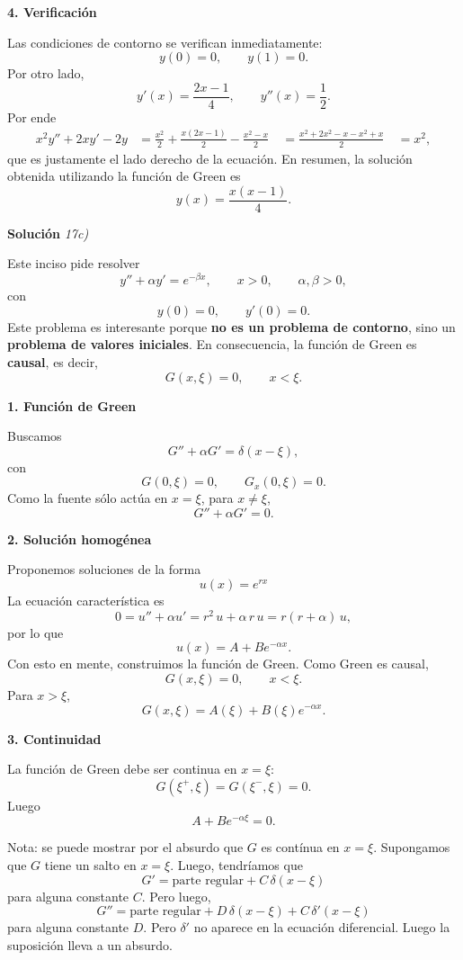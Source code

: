 \documentclass[11pt,spanish]{article}
\newcounter{problema}
\begin{document}
{\bf 4. Verificaci\'on}

Las condiciones de contorno se verifican inmediatamente:
$$
y(0)=0,
\qquad
y(1)=0.
$$
Por otro lado,
$$
y'(x)=\frac{2x-1}{4},
\qquad
y''(x)=\frac12.
$$
Por ende
$$
\begin{aligned}
x^2y''+2xy'-2y
&=
\frac{x^2}{2}
+\frac{x(2x-1)}{2}
-\frac{x^2-x}{2} \
&=
\frac{x^2+2x^2-x-x^2+x}{2} \
&=
x^2,
\end{aligned}
$$
que es justamente el lado derecho de la ecuaci\'on.
En resumen, la soluci\'on obtenida utilizando la funci\'on de Green es
$$
\boxed{y(x)=\frac{x(x-1)}{4}.}
$$

\vspace{0.5cm}
{\bf Soluci\'on }{\em 17c)}
\vspace{0.5cm}

Este inciso pide resolver 
$$
y''+\alpha y'=e^{-\beta x},
\qquad x>0,
\qquad
\alpha,\beta>0,
$$
con
$$
y(0)=0,
\qquad
y'(0)=0.
$$
Este problema es interesante porque {\bf no es un problema de contorno}, sino un {\bf problema de valores iniciales}. 
En consecuencia, la función de Green es {\bf causal}, es decir,
$$
G(x,\xi)=0,
\qquad x<\xi.
$$

{\bf 1. Función de Green}

Buscamos
$$
G''+\alpha G'
=
\delta(x-\xi),
$$
con
$$
G(0,\xi)=0,
\qquad
G_x(0,\xi)=0.
$$
Como la fuente sólo actúa en $x=\xi$, para $x\neq\xi$,
$$
G''+\alpha G'=0.
$$

{\bf 2. Solución homogénea}

Proponemos soluciones de la forma
$$
u(x) = e^{rx}
$$
La ecuación característica es
$$
0
=
u''+\alpha u'
=
r^2\, u + \alpha \,r\, u
=
r(r+\alpha)\,u,
$$
por lo que
$$
u(x)=A+Be^{-\alpha x}.
$$
Con esto en mente, construimos la funci\'on de Green.
Como Green es causal,
$$
G(x,\xi)=0,
\qquad x<\xi.
$$
Para $x>\xi$,
$$
G(x,\xi)
=
A(\xi)
+
B(\xi)e^{-\alpha x}.
$$

{\bf 3. Continuidad}

La función de Green debe ser continua en $x=\xi$:
$$
G(\xi^+,\xi)=G(\xi^-,\xi)=0.
$$
Luego
$$
A+B e^{-\alpha\xi}=0.
$$

Nota: se puede mostrar por el absurdo que $G$ es contínua en $x=\xi$.
Supongamos que $G$ tiene un salto en $x=\xi$.
Luego, tendríamos que
$$
G' = \text{parte regular} + C\,\delta(x-\xi)
$$
para alguna constante $C$.
Pero luego,
$$
G'' = \text{parte regular} + D\,\delta(x-\xi) + C\,\delta'(x-\xi)
$$
para alguna constante $D$.
Pero $\delta'$ no aparece en la ecuación diferencial.
Luego la suposición lleva a un absurdo.
\end{document}
